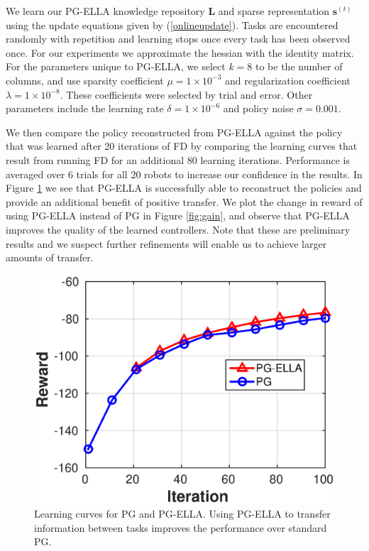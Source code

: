 \documentclass{aamas2016}
\newcommand{\note}[3]{{\color{#2} [ \ding{42} \textbf{#1:} {\small #3} ]}}
\newcommand{\comGabe}[1]{\note{Gabe}{cyan}{#1}}
\begin{document}
We learn our PG-ELLA knowledge repository $\bm{L}$ and sparse representation $\bm{s}^{(t)}$ using the update equations given 
by (\ref{onlineupdate}). Tasks are encountered randomly with repetition and learning stops once every task has been observed 
once. For our experiments we approximate the hessian with the identity matrix. For the parameters unique to PG-ELLA, we select $k=8$ to be the number of columns, and use sparsity coefficient $\mu = 1\times 10^{-3}$ and regularization coefficient $\lambda = 1\times 10^{-8}$. These coefficients were selected by trial and error. Other parameters include the learning rate $\delta=1\times 10^{-6}$ and policy noise $\sigma=0.001$. 

We then compare the policy reconstructed from PG-ELLA against the policy that was learned after 20 iterations of FD by comparing the learning curves that result from running FD for an additional 80 learning iterations. Performance is averaged over 6 trials for all 20 robots to increase our confidence in the results. In Figure \ref{fig:reward} we see that PG-ELLA is successfully able to reconstruct the policies and provide an additional benefit of positive transfer. We plot the change in reward of using PG-ELLA instead of PG in Figure \ref{fig:gain}, and observe that PG-ELLA improves the quality of the learned controllers. Note that these are preliminary results and we suspect further refinements will enable us to achieve larger amounts of transfer.

\begin{figure}[!htbp]
    \centering
        \includegraphics[width=.42\textwidth]{images/2016_02_06_learning.eps}
        \caption{Learning curves for PG and PG-ELLA. Using PG-ELLA to transfer information between tasks improves the performance over standard PG. %
        }\label{fig:reward}
\end{figure}
\end{document}
